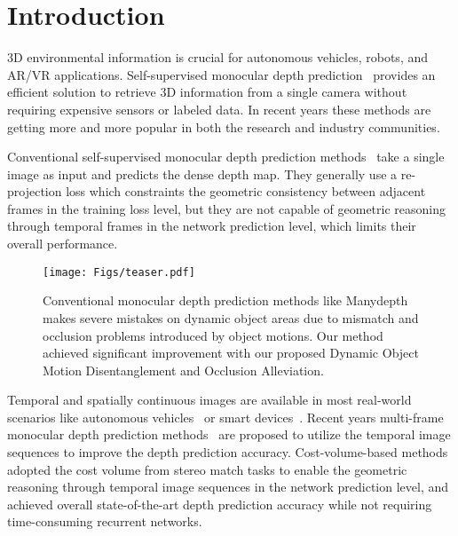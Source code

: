 \documentclass[runningheads]{llncs}
\begin{document}
\section{Introduction}


3D environmental information is crucial for autonomous vehicles, robots, and AR/VR applications. Self-supervised monocular depth prediction~\cite{monodepth,monodepth2,packnet,featdepth} provides an efficient solution to retrieve 3D information from a single camera without requiring expensive sensors or labeled data. In recent years these methods are getting more and more popular in both the research and industry communities.

Conventional self-supervised monocular depth prediction methods~\cite{monodepth,monodepth2,packnet} take a single image as input and predicts the dense depth map. They generally use a re-projection loss which constraints the geometric consistency between adjacent frames in the training loss level, but they are not capable of geometric reasoning through temporal frames in the network prediction level, which limits their overall performance.

\begin{figure*}
\centering
\texttt{[image: Figs/teaser.pdf]}
\caption{  Conventional monocular depth prediction methods like Manydepth~\cite{manydepth} makes severe mistakes on dynamic object areas due to mismatch and occlusion problems introduced by object motions. Our method achieved significant improvement with our proposed Dynamic Object Motion Disentanglement and Occlusion Alleviation.}
\label{fig:1}
\end{figure*}

Temporal and spatially continuous images are available in most real-world scenarios like autonomous vehicles~\cite{Cityscapes,kitti} or smart devices~\cite{ha2016high,joshi2014micro}. Recent years multi-frame monocular depth prediction methods~\cite{cs2018depthnet,manydepth,monorec,patil2020dont,wang2019recurrent,zhang2019exploiting} are proposed to utilize the temporal image sequences to improve the depth prediction accuracy. Cost-volume-based methods~\cite{manydepth,monorec} adopted the cost volume from stereo match tasks to enable the geometric reasoning through temporal image sequences in the network prediction level, and achieved overall state-of-the-art depth prediction accuracy while not requiring time-consuming recurrent networks.
\end{document}
